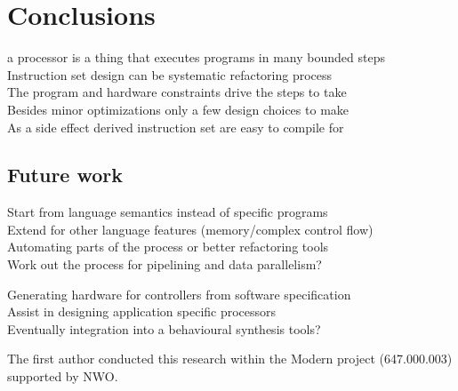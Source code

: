 \documentclass[preprint]{sigplanconf}
\begin{document}
\section{Conclusions}

a processor is a thing that executes programs in many bounded steps \\

Instruction set design can be systematic refactoring process \\
The program and hardware constraints drive the steps to take \\
Besides minor optimizations only a few design choices to make \\
As a side effect derived instruction set are easy to compile for


\subsection{Future work}

Start from language semantics instead of specific programs \\
Extend for other language features (memory/complex control flow) \\
Automating parts of the process or better refactoring tools\\
Work out the process for pipelining and data parallelism? 

Generating hardware for controllers from software specification \\
Assist in designing application specific processors \\
Eventually integration into a behavioural synthesis tools?



\begin{acks}
The first author conducted this research within the Modern project (647.000.003) supported by NWO.
\end{acks}


\end{document}
